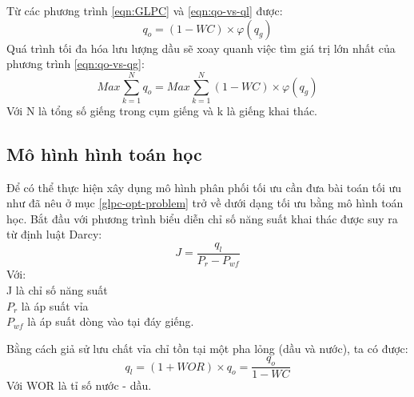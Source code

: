 \documentclass[12pt,a4paper]{report}
\begin{document}
Từ các phương trình \ref{eqn:GLPC} và \ref{eqn:qo-vs-ql} được:
	\begin{equation}\label{eqn:qo-vs-qg}
		q_o = (1 - WC) \times \varphi(q_g)
	\end{equation}
Quá trình tối đa hóa lưu lượng dầu sẽ xoay quanh việc tìm giá trị lớn nhất của phương trình \ref{eqn:qo-vs-qg}:
	\begin{equation}\label{eqn:max-qo}
		Max\sum_{k=1}^Nq_o = Max\sum_{k=1}^N(1 - WC) \times \varphi(q_g)
	\end{equation}
Với N là tổng số giếng trong cụm giếng và k là giếng khai thác.\\

\subsection{Mô hình hình toán học}
Để có thể thực hiện xây dụng mô hình phân phối tối ưu cần đưa bài toán tối ưu như đã nêu ở mục \ref{glpc-opt-problem} trở về dưới dạng tối ưu bằng mô hình toán học. Bắt đầu với phương trình biểu diễn chỉ số năng suất khai thác được suy ra từ định luật Darcy:
	\begin{equation}\label{eqn:darcy-productivity-index}
		J = \dfrac{q_l}{P_r - P_{wf}}
	\end{equation}
Với:\\
\hspace*{1cm}J là chỉ số năng suất\\
\hspace*{1cm}$P_r$ là áp suất vỉa\\
\hspace*{1cm}$P_{wf}$ là áp suất dòng vào tại đáy giếng.

Bằng cách giả sử lưu chất vỉa chỉ tồn tại một pha lỏng (dầu và nước), ta có được:
	\begin{equation}\label{eqn:qo-ql-wc}
		q_l = (1 + WOR) \times q_o = \dfrac{q_o}{1 - WC}
	\end{equation}
Với WOR là tỉ số nước - dầu.
\end{document}
